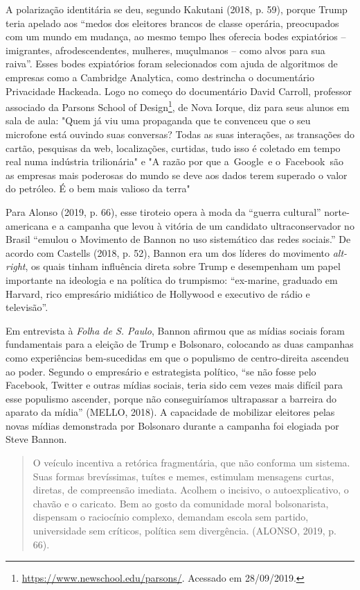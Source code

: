A polarização identitária se deu, segundo Kakutani (2018, p. 59), porque
Trump teria apelado aos ``medos dos eleitores brancos de classe
operária, preocupados com um mundo em mudança, ao mesmo tempo lhes
oferecia bodes expiatórios -- imigrantes, afrodescendentes, mulheres,
muçulmanos -- como alvos para sua raiva''. Esses bodes expiatórios foram
selecionados com ajuda de algoritmos de empresas como a Cambridge
Analytica, como destrincha o documentário Privacidade Hackeada. Logo no
começo do documentário David Carroll, professor associado da Parsons
School of Design\footnote{\url{https://www.newschool.edu/parsons/}.
  Acessado em 28/09/2019.}, de Nova Iorque, diz para seus alunos em sala
de aula: "Quem já viu uma propaganda que te convenceu que o seu
microfone está ouvindo suas conversas? Todas as suas interações, as
transações do cartão, pesquisas da web, localizações, curtidas, tudo
isso é coletado em tempo real numa indústria trilionária" e "A razão por
que a~Google~e o~Facebook~são as empresas mais poderosas do mundo se
deve aos dados terem superado o valor do petróleo. É o bem mais valioso
da terra"

Para Alonso (2019, p. 66), esse tiroteio opera à moda da ``guerra
cultural'' norte-americana e a campanha que levou à vitória de um
candidato ultraconservador no Brasil ``emulou o Movimento de Bannon no
uso sistemático das redes sociais.'' De acordo com Castells (2018, p.
52), Bannon era um dos líderes do movimento \emph{alt-right}, os quais
tinham influência direta sobre Trump e desempenham um papel importante
na ideologia e na política do trumpismo: ``ex-marine, graduado em
Harvard, rico empresário midiático de Hollywood e executivo de rádio e
televisão''.

Em entrevista à \emph{Folha de S. Paulo}, Bannon afirmou que as mídias
sociais foram fundamentais para a eleição de Trump e Bolsonaro,
colocando as duas campanhas como experiências bem-sucedidas em que o
populismo de centro-direita ascendeu ao poder. Segundo o empresário e
estrategista político, ``se não fosse pelo Facebook, Twitter e outras
mídias sociais, teria sido cem vezes mais difícil para esse populismo
ascender, porque não conseguiríamos ultrapassar a barreira do aparato da
mídia'' (MELLO, 2018). A capacidade de mobilizar eleitores pelas novas
mídias demonstrada por Bolsonaro durante a campanha foi elogiada por
Steve Bannon.

\begin{quote}
O veículo incentiva a retórica fragmentária, que não conforma um
sistema. Suas formas brevíssimas, tuítes e memes, estimulam mensagens
curtas, diretas, de compreensão imediata. Acolhem o incisivo, o
autoexplicativo, o chavão e o caricato. Bem ao gosto da comunidade moral
bolsonarista, dispensam o raciocínio complexo, demandam escola sem
partido, universidade sem críticos, política sem divergência. (ALONSO,
2019, p. 66).
\end{quote}

